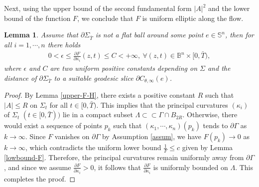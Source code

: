 \documentclass[11pt,reqno]{amsart}
\newtheorem{lem}[thm]{Lemma}
\theoremstyle{definition}
\theoremstyle{remark}
\numberwithin{equation}{section}
\renewcommand{\(}{\left(}
\renewcommand{\)}{\right)}
\renewcommand{\-}{\overline}
\begin{document}
Next, using the upper bound of the second fundamental form $\vert A\vert^2$ and the lower bound of the function $F$, we conclude that $F$ is uniform elliptic along the flow.
\begin{lem}\label{uniform elliptic}
	 Assume that $\partial\Sigma_{\bar{T}}$ is not a flat ball around some point $e\in\mathbb{S}^n$, then for all $ i=1,\cdots,n$ there holds
	\begin{align*}
		0<\epsilon\leq \frac{\partial F}{\partial\kappa_i}(z,t)\leq C<+\infty, \ \forall  (z,t)\in \mathbb{B}^n\times[0,\bar{T}),
	\end{align*} 
	where $\epsilon$ and $C$ are two uniform positive  constants  depending on $\Sigma$ and the distance of $\partial\Sigma_{\bar{T}}$ to a suitable geodesic slice $\partial C_{\theta,\infty}(e)$.
\end{lem}
\begin{proof}
	By Lemma \ref{upper-F-H},  there exists a positive constant $R$ such that $\vert A\vert\leq R$ on $\Sigma_t$ for all $t\in[0,\bar{T})$. This implies that the principal curvatures $(\kappa_i)$ of $\Sigma_t $ $(t\in[0,\bar{T}))$ lie in a compact subset $\Lambda\subset\subset\Gamma\cap B_{2R}$. Otherwise, there would exist a sequence of points $p_k$ such that $(\kappa_1,\cdots,\kappa_n)(p_k)$ tends to $\partial\Gamma$ as $k\to \infty$. Since $F$ vanishes on $\partial\Gamma$ by Assumption \ref{assum}, we have $F(p_k)\to 0$ as $k\to\infty$, which contradicts the uniform lower bound $\frac{1}{F}\leq c$ given by Lemma \ref{lowbound-F}. Therefore, the principal curvatures remain uniformly away from $\partial\Gamma$, and since we assume $\frac{\partial F}{\partial\kappa_i}>0$, it follows that
	 $\frac{\partial F}{\partial\kappa_i}$ is uniformly bounded on $\Lambda$. This completes the proof.
\end{proof}
\end{document}
